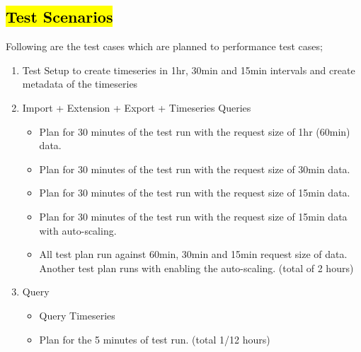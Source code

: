 \subsection{\hl{Test Scenarios}}
\label{subse:test_plan_flow}
Following are the test cases which are planned to performance test cases;
\begin{enumerate}
    \item Test Setup to create timeseries in 1hr, 30min and 15min intervals and create metadata of the timeseries
    \item Import + Extension + Export + Timeseries Queries
    \begin{itemize}
        \item Plan for 30 minutes of the test run with the request size of 1hr (60min) data.
        \item Plan for 30 minutes of the test run with the request size of 30min data.
        \item Plan for 30 minutes of the test run with the request size of 15min data.
        \item Plan for 30 minutes of the test run with the request size of 15min data with auto-scaling.
        \item All test plan run against 60min, 30min and 15min request size of data. Another test plan runs with enabling the auto-scaling. (total of 2 hours)
    \end{itemize}
    \item Query
    \begin{itemize}
        \item Query Timeseries
        \item Plan for the 5 minutes of test run. (total 1/12 hours)
    \end{itemize}
\end{enumerate}


